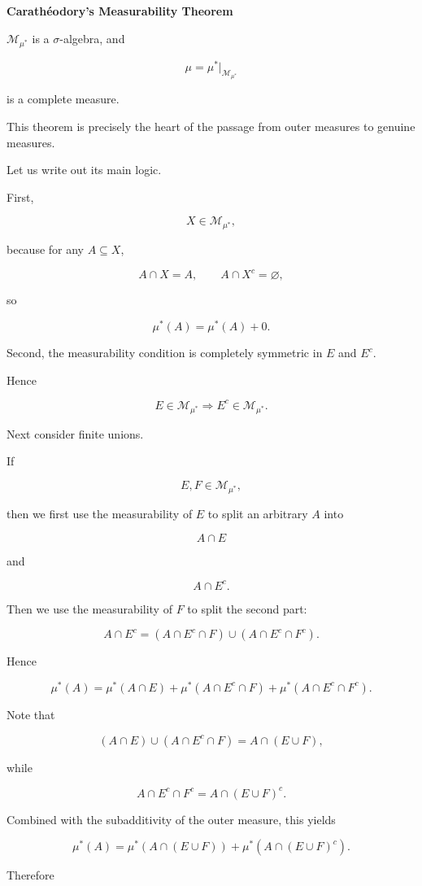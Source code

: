 \documentclass[11pt]{article}
\begin{document}
\textbf{Carathéodory's Measurability Theorem}

$\mathcal{M}_{\mu^{*}}$ is a $\sigma$-algebra, and

\[
\mu=\mu^{*}|_{\mathcal{M}_{\mu^{*}}}
\]

is a complete measure.

This theorem is precisely the heart of the passage from outer measures to genuine measures.

Let us write out its main logic.

First,

\[
X\in\mathcal{M}_{\mu^{*}},
\]

because for any $A\subseteq X$,

\[
A\cap X=A,\qquad A\cap X^{c}=\varnothing,
\]

so

\[
\mu^{*}(A)=\mu^{*}(A)+0.
\]

Second, the measurability condition is completely symmetric in $E$ and $E^{c}$.

Hence

\[
E\in\mathcal{M}_{\mu^{*}}\Longrightarrow E^{c}\in\mathcal{M}_{\mu^{*}}.
\]

Next consider finite unions.

If

\[
E,F\in\mathcal{M}_{\mu^{*}},
\]

then we first use the measurability of $E$ to split an arbitrary $A$ into

\[
A\cap E
\]

and

\[
A\cap E^{c}.
\]

Then we use the measurability of $F$ to split the second part:

\[
A\cap E^{c}=(A\cap E^{c}\cap F)\cup(A\cap E^{c}\cap F^{c}).
\]

Hence

\[
\mu^{*}(A)=\mu^{*}(A\cap E)+\mu^{*}(A\cap E^{c}\cap F)+\mu^{*}(A\cap E^{c}\cap F^{c}).
\]

Note that

\[
(A\cap E)\cup(A\cap E^{c}\cap F)=A\cap(E\cup F),
\]

while

\[
A\cap E^{c}\cap F^{c}=A\cap(E\cup F)^{c}.
\]

Combined with the subadditivity of the outer measure, this yields

\[
\mu^{*}(A)=\mu^{*}(A\cap(E\cup F))+\mu^{*}(A\cap(E\cup F)^{c}).
\]

Therefore
\end{document}
